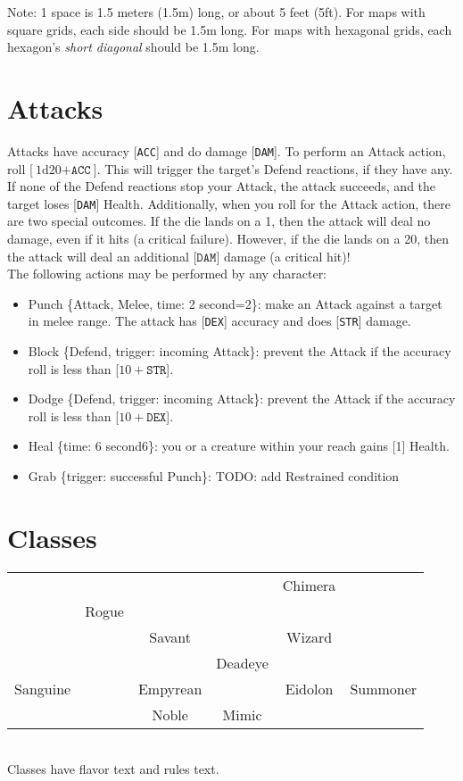 \documentclass[12pt]{article}
\newcommand{\STR}{\texttt{STR}}
\newcommand{\DEX}{\texttt{DEX}}
\newcommand{\ACC}{\texttt{ACC}}
\newcommand{\DAM}{\texttt{DAM}}
\newcommand{\TIME}[1]{\{time: #1 second\if1#1{}\else{s}\fi\}}
\newcommand{\TRIG}[1]{\{trigger: #1\}}
\newcommand{\MELEE}[1]{\{Attack, Melee, time: #1 second\if1=#1{}\else{s}\fi\}}
\newcommand{\DEFEND}{\{Defend, trigger: incoming Attack\}}
\newcommand{\dice}[2]{\text{#1d#2}}
\begin{document}
Note: 1 space is 1.5 meters (1.5m) long, or about 5 feet (5ft). For maps with square grids, each side should be 1.5m long. For maps with hexagonal grids, each hexagon’s \textit{short diagonal} should be 1.5m long.

\pagebreak
\section{Attacks}

Attacks have accuracy [\ACC] and do damage [\DAM]. To perform an Attack action, roll [$\dice{1}{20} + \ACC$]. This will trigger the target’s Defend reactions, if they have any. If none of the Defend reactions stop your Attack, the attack succeeds, and the target loses [\DAM] Health. Additionally, when you roll for the Attack action, there are two special outcomes. If the die lands on a 1, then the attack will deal no damage, even if it hits (a critical failure). However, if the die lands on a 20, then the attack will deal an additional [$\DAM$] damage (a critical hit)!
\\[5mm]
The following actions may be performed by any character:
\begin{itemize}

\item Punch \MELEE{2}: make an Attack against a target in melee range. The attack has [\DEX] accuracy and does [\STR] damage.

\item Block \DEFEND: prevent the Attack if the accuracy roll is less than [$10 + \STR$].

\item Dodge \DEFEND: prevent the Attack if the accuracy roll is less than [$10 + \DEX$].

\item Heal \TIME{6}: you or a creature within your reach gains [1] Health.

\item Grab \TRIG{successful Punch}: TODO: add Restrained condition

\end{itemize}

\pagebreak
\section{Classes}

\begin{tabularx}{\textwidth}{CCCCCC}
 &  &  &  & Chimera &  \\
 & Rogue &  &  &  &  \\
 &  & Savant &  & Wizard &  \\
 &  &  & Deadeye &  &   \\
Sanguine &  & Empyrean &  & Eidolon & Summoner \\
 &  & Noble & Mimic &  &  \\
\end{tabularx}
\\[5mm]
Classes have flavor text and rules text.
\end{document}
